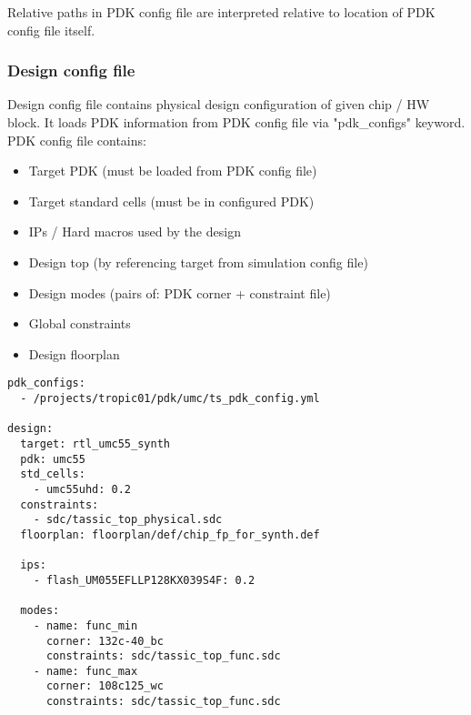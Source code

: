 \documentclass{tropic_design_spec}
\begin{document}
Relative paths in PDK config file are interpreted relative to location of PDK config
file itself.



\subsubsection{Design config file}
\label{sec:design-config-file}

Design config file contains physical design configuration of given chip / HW block.
It loads PDK information from PDK config file via "pdk_configs" keyword.
PDK config file contains:
\begin{itemize}
    \item {Target PDK (must be loaded from PDK config file)}
    \item {Target standard cells (must be in configured PDK)}
    \item {IPs / Hard macros used by the design}
    \item {Design top (by referencing target from simulation config file)}
    \item {Design modes (pairs of: PDK corner + constraint file)}
    \item {Global constraints}
    \item {Design floorplan}
\end{itemize}

\begin{lstlisting}[basicstyle=\footnotesize]
pdk_configs:
  - /projects/tropic01/pdk/umc/ts_pdk_config.yml

design:
  target: rtl_umc55_synth
  pdk: umc55
  std_cells:
    - umc55uhd: 0.2
  constraints:
    - sdc/tassic_top_physical.sdc
  floorplan: floorplan/def/chip_fp_for_synth.def

  ips:
    - flash_UM055EFLLP128KX039S4F: 0.2

  modes:
    - name: func_min
      corner: 132c-40_bc
      constraints: sdc/tassic_top_func.sdc
    - name: func_max
      corner: 108c125_wc
      constraints: sdc/tassic_top_func.sdc
\end{lstlisting}
\end{document}
